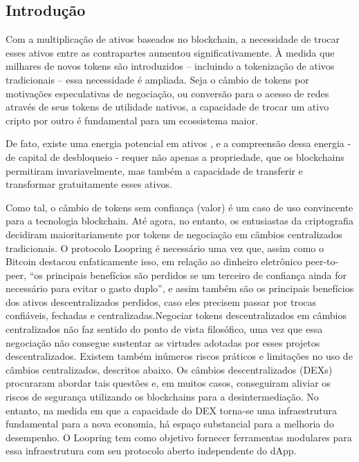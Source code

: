 \documentclass[UTF8,nofonts]{article}
\begin{document}
\begin{multicols}{2}
\section{Introdução\label{sec:introduction}}


Com a multiplicação de ativos baseados no blockchain, a necessidade de trocar esses ativos entre as contrapartes aumentou significativamente. À medida que milhares de novos tokens são introduzidos – incluindo a tokenização de ativos tradicionais – essa necessidade é ampliada. Seja o câmbio de tokens por motivações especulativas de negociação, ou conversão para o acesso de redes através de seus tokens de utilidade nativos, a capacidade de trocar um ativo cripto por outro é fundamental para um ecossistema maior. 

De fato, existe uma energia potencial em ativos  \cite{desotocapital}, e a compreensão dessa energia - de capital de desbloqueio - requer não apenas a propriedade, que os blockchains permitiram invariavelmente, mas também a capacidade de transferir e transformar gratuitamente esses ativos.
 
Como tal, o câmbio de tokens sem confiança (valor) é um caso de uso convincente para a tecnologia blockchain. Até agora, no entanto, os entusiastas da criptografia decidiram maioritariamente por tokens de negociação em câmbios centralizados tradicionais. O protocolo Loopring é necessário uma vez que, assim como o Bitcoin  \cite{nakamoto2008bitcoin} destacou enfaticamente isso, em relação ao dinheiro eletrônico peer-to-peer, “os principais benefícios são perdidos se um terceiro de confiança ainda for necessário para evitar o gasto duplo”, e assim também são os principais benefícios dos ativos descentralizados perdidos, caso eles precisem passar por trocas confiáveis, fechadas e centralizadas.Negociar tokens descentralizados em câmbios centralizados não faz sentido do ponto de vista filosófico, uma vez que essa negociação não consegue sustentar as virtudes adotadas por esses projetos descentralizados. 
Existem também inúmeros riscos práticos e limitações no uso de câmbios centralizados, descritos abaixo. Os câmbios descentralizados (DEXs) \cite{schuh2015bitshares} \cite{bancor} \cite{kyber} procuraram abordar tais questões e, em muitos casos, conseguiram aliviar os riscos de segurança utilizando os blockchains para a desintermediação. No entanto, na medida em que a capacidade do DEX torna-se uma infraestrutura fundamental para a nova economia, há espaço substancial para a melhoria do desempenho. O Loopring tem como objetivo fornecer ferramentas modulares para essa infraestrutura com seu protocolo aberto independente do dApp.



\end{multicols}
\end{document}
